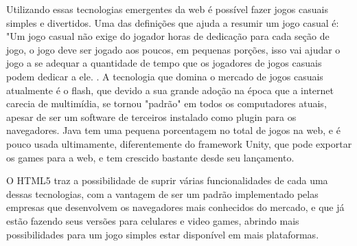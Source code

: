 Utilizando essas tecnologias emergentes da web é possível fazer jogos casuais simples
e divertidos. Uma das definições que ajuda a resumir um jogo casual é: "Um jogo casual não exige do jogador horas de
dedicação para cada seção de jogo, o jogo deve ser jogado aos poucos, em pequenas
porções, isso vai ajudar o jogo a se adequar a quantidade de tempo que os jogadores
de jogos casuais podem dedicar a ele. \cite{trefry2010casual}.
A tecnologia que domina o mercado de jogos casuais atualmente é o flash, que devido
a sua grande adoção na época que a internet carecia de multimídia, se tornou "padrão"
em todos os computadores atuais, apesar de ser um software de terceiros instalado
como plugin para os navegadores. Java tem uma pequena porcentagem no total de jogos
na web, e é pouco usada ultimamente, diferentemente do framework Unity, que pode exportar
os games para a web, e tem crescido bastante desde seu lançamento.

O HTML5 traz a possibilidade de suprir várias funcionalidades de cada uma dessas tecnologias,
com a vantagem de ser um padrão implementado pelas empresas que desenvolvem os navegadores
mais conhecidos do mercado, e que já estão fazendo seus versões para celulares e
video games, abrindo mais possibilidades para um jogo simples estar disponível em mais plataformas.

